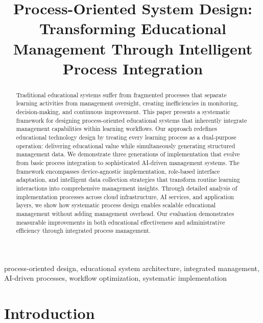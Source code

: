 \documentclass[conference]{IEEEtran}
\begin{document}
\title{Process-Oriented System Design: Transforming Educational Management Through Intelligent Process Integration}

\author{
}

\maketitle

\begin{abstract}
Traditional educational systems suffer from fragmented processes that separate learning activities from management oversight, creating inefficiencies in monitoring, decision-making, and continuous improvement. This paper presents a systematic framework for designing process-oriented educational systems that inherently integrate management capabilities within learning workflows. Our approach redefines educational technology design by treating every learning process as a dual-purpose operation: delivering educational value while simultaneously generating structured management data. We demonstrate three generations of implementation that evolve from basic process integration to sophisticated AI-driven management systems. The framework encompasses device-agnostic implementation, role-based interface adaptation, and intelligent data collection strategies that transform routine learning interactions into comprehensive management insights. Through detailed analysis of implementation processes across cloud infrastructure, AI services, and application layers, we show how systematic process design enables scalable educational management without adding management overhead. Our evaluation demonstrates measurable improvements in both educational effectiveness and administrative efficiency through integrated process management.
\end{abstract}

\begin{IEEEkeywords}
process-oriented design, educational system architecture, integrated management, AI-driven processes, workflow optimization, systematic implementation
\end{IEEEkeywords}

\section{Introduction}
\end{document}
